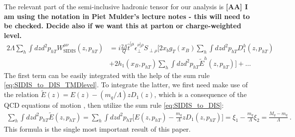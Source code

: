 \documentclass[preprintnumbers,floatfix,nofootinbib]{revtex4}
\newcommand{\todo}[1]{\marginpar{$\bullet$}\textbf{#1}}
\newcommand{\mj}{M_q}
\begin{document}
The relevant part of the semi-inclusive hadronic tensor for our analysis is 
\todo{[AA] I am using the notation in Piet Mulder's lecture notes - this will need to be checked. Decide also if we want this at parton or charge-weighted level.}
\begin{align}
  \label{eq:Wsidis_ini}
  2 \Lambda \sum_h \int dz d^2p_{hT} W^{\mu\nu}_{\text{SIDIS}}(z,p_{hT}) 
    & = i \frac{2\Lambda}{Q} 
    \hat t^{[\mu} \epsilon_\perp^{\nu]\rho}S_{\perp\rho} 
    \Big[ 2 x_b g_T(x_B) \sum_h \int dz d^2p_{hT} D_1^h(z,p_{hT}) \\
  & + 2 h_1(x_B,p_{hT}) \sum_h \int dz d^2p_{hT} \tilde E^h(z,p_{hT}) \Big] + \ldots
\end{align}
The first term can be easily integrated with the help of the sum rule \eqref{eq:SIDIS_to_DIS_TMDlevel}. To integrate the latter, we first need make use of the relation $\tilde E(z) = E(z) - (m_q/\Lambda) z D_1(z)$, which is a consequence of the QCD equations of motion \cite{New-testament}, then utilize the sum rule \eqref{eq:SIDIS_to_DIS}:
\begin{align}
  \sum_h \int dz d^2p_{hT} \tilde E(z,p_{hT}) 
    = \sum_h \int dz d^2p_{hT} \Big[ E(z,p_{hT}) - \frac{m_q}{\Lambda} z D_1(z,p_{hT}) \Big]
    = \xi_1 - \frac{m_q}{\Lambda} \xi_2 = \frac{\mj - m_q}{\Lambda} \ .
\end{align}
This formula is the single most important result of this paper. 
\end{document}
